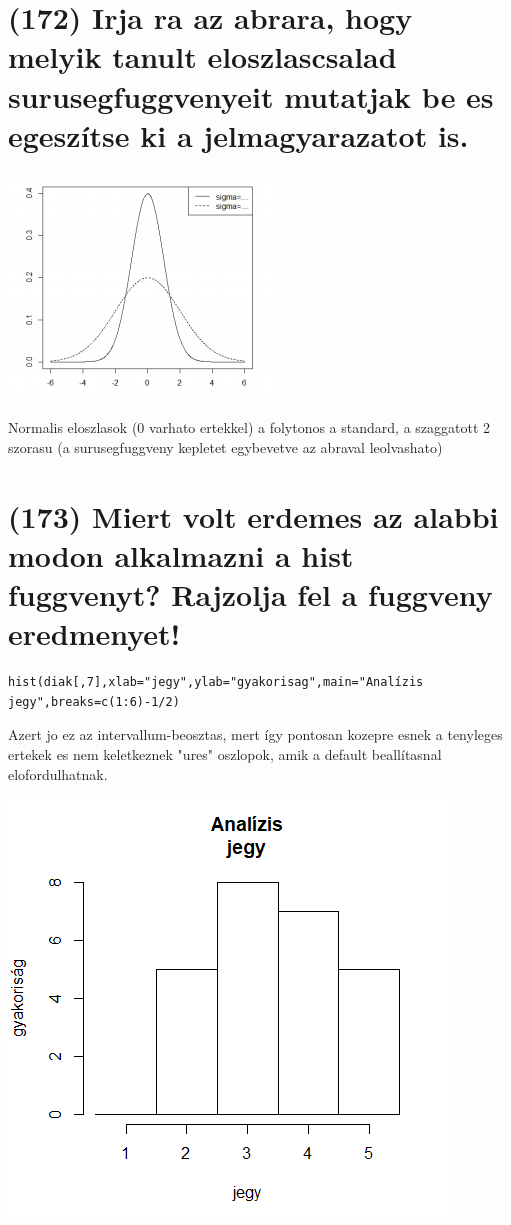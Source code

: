\documentclass[12p]{article}
\begin{document}
\section{(172) Irja ra az abrara, hogy melyik tanult eloszlascsalad surusegfuggvenyeit mutatjak be es
egeszítse ki a jelmagyarazatot is.}

\includegraphics{fuggveny}

 Normalis eloszlasok (0 varhato ertekkel) a folytonos a standard, a szaggatott 2 szorasu
(a surusegfuggveny kepletet egybevetve az abraval leolvashato)


\section{(173) Miert volt erdemes az alabbi modon alkalmazni a hist fuggvenyt? Rajzolja fel a fuggveny eredmenyet! }

\begin{verbatim}
hist(diak[,7],xlab="jegy",ylab="gyakorisag",main="Analízis
jegy",breaks=c(1:6)-1/2)
\end{verbatim}

Azert jo ez az intervallum-beosztas, mert így pontosan kozepre esnek a tenyleges ertekek
es nem keletkeznek "ures" oszlopok, amik a default beallítasnal elofordulhatnak.

\includegraphics{histogram}
\end{document}
